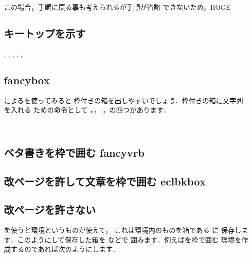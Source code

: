 \begin{inout}
この場合，手順に戻る事も考えられるが手順が省略
できないため，HOGE
\end{inout}


\subsection{キートップを示す}
\begin{usage}
\usepackage{okumacro}
\end{usage}

\begin{inout}
 , \return, \upkey, \downkey, \rightkey, \leftkey
\end{inout}

\subsection{fancybox}
によるを使ってみると
枠付きの箱を出しやすいでしょう．枠付きの箱に文字列を入れる
ための命令として ，，
，の四つがあります．
\begin{inout}
 \\
\end{inout}

\subsection{ベタ書きを枠で囲む fancyvrb}

\subsection{改ページを許して文章を枠で囲む eclbkbox}

\subsection{改ページを許さない}

を使うと環境というものが使えて，
これは環境内のものを箱である に
保存します．このようにして保存した箱を などで
囲みます．例えばを枠で囲む
環境を作成するのであれば次のようにします．

